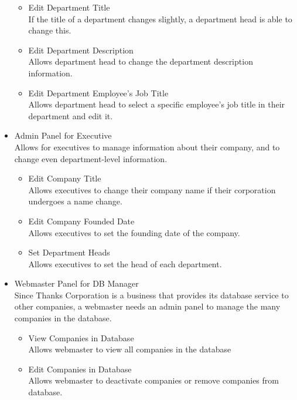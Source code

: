 \documentclass[11pt]{report}
\begin{document}
\begin{itemize}
    \begin{itemize}
        \item Edit Department Title \\
        If the title of a department changes slightly, a department head is able to change this.
        \item Edit Department Description \\
        Allows department head to change the department description information.
        \item Edit Department Employee's Job Title \\
        Allows department head to select a specific employee's job title in their department and edit it.
    \end{itemize}
    \item Admin Panel for Executive \\
    Allows for executives to manage information about their company, and to change even department-level information.
    \begin{itemize}
        \item Edit Company Title \\
        Allows executives to change their company name if their corporation undergoes a name change.
        \item Edit Company Founded Date \\
        Allows executives to set the founding date of the company.
        \item Set Department Heads \\
        Allows executives to set the head of each department.
    \end{itemize}
    \item Webmaster Panel for DB Manager \\
    Since Thanks Corporation is a business that provides its database service to other companies, a webmaster needs an admin panel to manage the many companies in the database.
    \begin{itemize}
        \item View Companies in Database \\
        Allows webmaster to view all companies in the database
        \item Edit Companies in Database \\
        Allows webmaster to deactivate companies or remove companies from database.
    \end{itemize}
\end{itemize}
\clearpage
\end{document}

